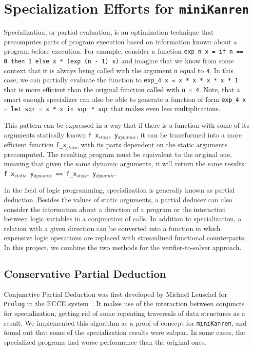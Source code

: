 \section{Specialization Efforts for \texttt{miniKanren}}

Specialization, or partial evaluation, is an optimization technique that precomputes parts of program execution based on information known about a program before execution. 
For example, consider a function \texttt{exp n x = if n == 0 then 1 else x * (exp (n - 1) x)} and imagine that we know from some context that it is always being called with the argument \texttt{n} equal to  \texttt{4}. 
In this case, we can partially evaluate the function to \texttt{exp\_4 x = x * x * x * x * 1} that is more efficient than the original function called with \texttt{n = 4}. 
Note, that a smart enough specializer can also be able to generate a function of form \texttt{exp\_4 x = let sqr = x * x in sqr * sqr} that makes even less multiplications. 

This pattern can be expressed in a way that if there is a function with some of its arguments statically known \texttt{f x$_{static}$ y$_{dynamic}$}, it can be transformed into a more efficient function \texttt{f\_x$_{static}$} with its parts dependent on the static arguments precomputed.
The resulting program must be equivalent to the original one, meaning that given the same dynamic arguments, it will return the same results: \texttt{f x$_{static}$ y$_{dynamic}$ == f\_x$_{static}$ y$_{dynamic}$}.

In the field of logic programming, specialization is generally known as partial deduction. 
Besides the values of static arguments, a partial deducer can also consider the information about a direction of a program or the interaction between logic variables in a conjunction of calls. 
In addition to specialization, a relation with a given direction can be converted into a function in which expensive logic operations are replaced with streamlined functional counterparts. 
In this project, we combine the two methods for the verifier-to-solver approach.

\subsection{Conservative Partial Deduction}


Conjunctive Partial Deduction was first developed by Michael Leuschel for \texttt{Prolog} in the ECCE system~\cite{de1999conjunctive}. 
It makes use of the interaction between conjuncts for specialization, getting rid of some repeating traversals of data structures as a result. 
We implemented this algorithm as a proof-of-concept for \texttt{miniKanren}, and found out that some of the specialization results were subpar.
In some cases, the specialized programs had worse performance than the original ones. 

